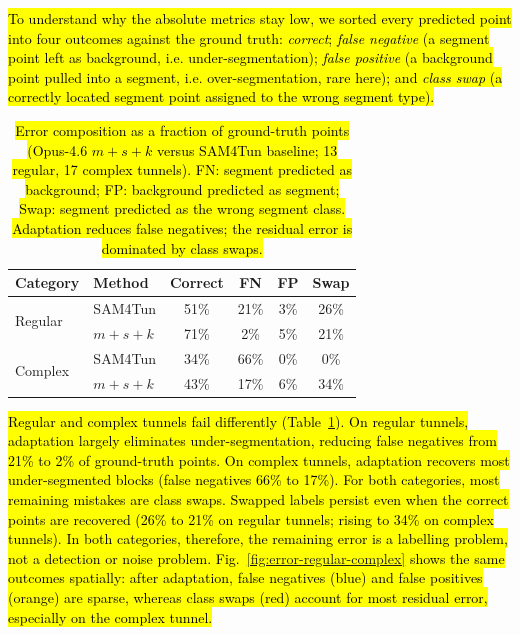\documentclass[a4paper,fleqn]{cas-dc}
\begin{document}
{\hl{To understand why the absolute metrics stay low, we sorted every predicted point into four outcomes against the ground truth: \textit{correct}; \textit{false negative} (a segment point left as background, i.e. under-segmentation); \textit{false positive} (a background point pulled into a segment, i.e. over-segmentation, rare here); and \textit{class swap} (a correctly located segment point assigned to the wrong segment type).}

\begin{table}[ht]
\caption{\hl{Error composition as a fraction of ground-truth points (Opus-4.6 \mbox{$m+s+k$} versus SAM4Tun baseline; 13 regular, 17 complex tunnels). FN: segment predicted as background; FP: background predicted as segment; Swap: segment predicted as the wrong segment class. Adaptation reduces false negatives; the residual error is dominated by class swaps.}}\label{tab:error-composition}
\begin{tabular*}{\tblwidth}{@{} l l c c c c @{}}
\toprule
Category & Method & Correct & FN & FP & Swap \\
\midrule
\multirow{2}{*}{Regular}
  & SAM4Tun     & 51\% & 21\% & 3\% & 26\% \\
  & \mbox{$m+s+k$} & 71\% & 2\%  & 5\% & 21\% \\
\midrule
\multirow{2}{*}{Complex}
  & SAM4Tun     & 34\% & 66\% & 0\% & 0\%  \\
  & \mbox{$m+s+k$} & 43\% & 17\% & 6\% & 34\% \\
\bottomrule
\end{tabular*}
\end{table}

\hl{Regular and complex tunnels fail differently (Table~\ref{tab:error-composition}). On regular tunnels, adaptation largely eliminates under-segmentation, reducing false negatives from 21\% to 2\% of ground-truth points. On complex tunnels, adaptation recovers most under-segmented blocks (false negatives 66\% to 17\%). For both categories, most remaining mistakes are class swaps. Swapped labels persist even when the correct points are recovered (26\% to 21\% on regular tunnels; rising to 34\% on complex tunnels). In both categories, therefore, the remaining error is a labelling problem, not a detection or noise problem. Fig.~\ref{fig:error-regular-complex} shows the same outcomes spatially: after adaptation, false negatives (blue) and false positives (orange) are sparse, whereas class swaps (red) account for most residual error, especially on the complex tunnel.}

}
\end{document}
